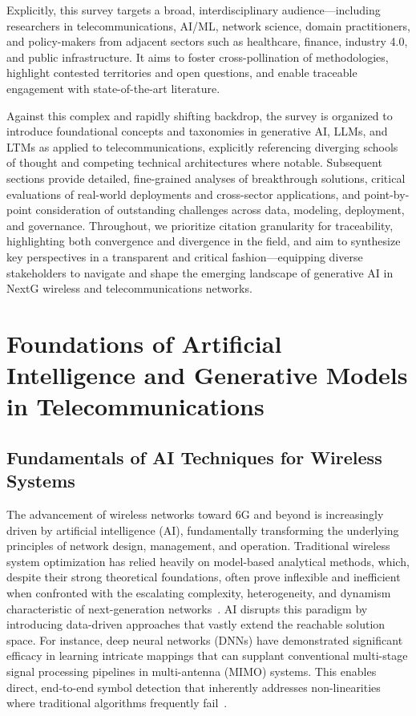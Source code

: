 \documentclass[sigconf]{acmart}
\begin{document}
Explicitly, this survey targets a broad, interdisciplinary audience—including researchers in telecommunications, AI/ML, network science, domain practitioners, and policy-makers from adjacent sectors such as healthcare, finance, industry 4.0, and public infrastructure. It aims to foster cross-pollination of methodologies, highlight contested territories and open questions, and enable traceable engagement with state-of-the-art literature.

Against this complex and rapidly shifting backdrop, the survey is organized to introduce foundational concepts and taxonomies in generative AI, LLMs, and LTMs as applied to telecommunications, explicitly referencing diverging schools of thought and competing technical architectures where notable. Subsequent sections provide detailed, fine-grained analyses of breakthrough solutions, critical evaluations of real-world deployments and cross-sector applications, and point-by-point consideration of outstanding challenges across data, modeling, deployment, and governance. Throughout, we prioritize citation granularity for traceability, highlighting both convergence and divergence in the field, and aim to synthesize key perspectives in a transparent and critical fashion—equipping diverse stakeholders to navigate and shape the emerging landscape of generative AI in NextG wireless and telecommunications networks.

\section{Foundations of Artificial Intelligence and Generative Models in Telecommunications}

\subsection{Fundamentals of AI Techniques for Wireless Systems}

The advancement of wireless networks toward 6G and beyond is increasingly driven by artificial intelligence (AI), fundamentally transforming the underlying principles of network design, management, and operation. Traditional wireless system optimization has relied heavily on model-based analytical methods, which, despite their strong theoretical foundations, often prove inflexible and inefficient when confronted with the escalating complexity, heterogeneity, and dynamism characteristic of next-generation networks~\cite{ref46}. AI disrupts this paradigm by introducing data-driven approaches that vastly extend the reachable solution space. For instance, deep neural networks (DNNs) have demonstrated significant efficacy in learning intricate mappings that can supplant conventional multi-stage signal processing pipelines in multi-antenna (MIMO) systems. This enables direct, end-to-end symbol detection that inherently addresses non-linearities where traditional algorithms frequently fail~\cite{ref43}. 
\end{document}

